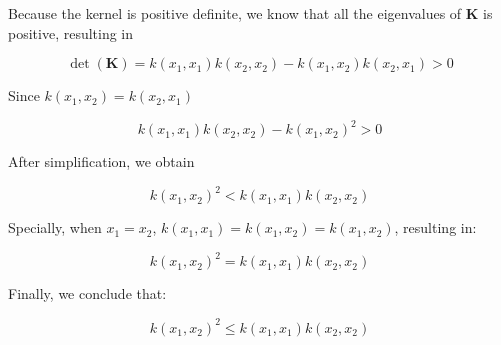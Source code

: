 \begin{solution}
    Because the kernel is positive definite, we know that all the eigenvalues of $\mathbf{K}$ is positive, resulting in

    \[
        \det(\mathbf{K}) = k(x_1, x_1)k(x_2, x_2) - k(x_1, x_2)k(x_2, x_1) > 0
    \]

    Since $k(x_1, x_2) = k(x_2, x_1)$

    \[
        k(x_1, x_1)k(x_2, x_2) - k(x_1, x_2)^2 > 0
    \]

    After simplification, we obtain

    \[
        k(x_1, x_2)^2 < k(x_1, x_1)k(x_2, x_2)
    \]

    Specially, when $x_1 = x_2$, $k(x_1, x_1) = k(x_1, x_2) = k(x_1, x_2)$, resulting in:

    \[
        k(x_1, x_2)^2 = k(x_1, x_1)k(x_2, x_2)
    \]

    Finally, we conclude that:

    \[
        k(x_1, x_2)^2 \le k(x_1, x_1)k(x_2, x_2)
    \]

\end{solution}

\newpage